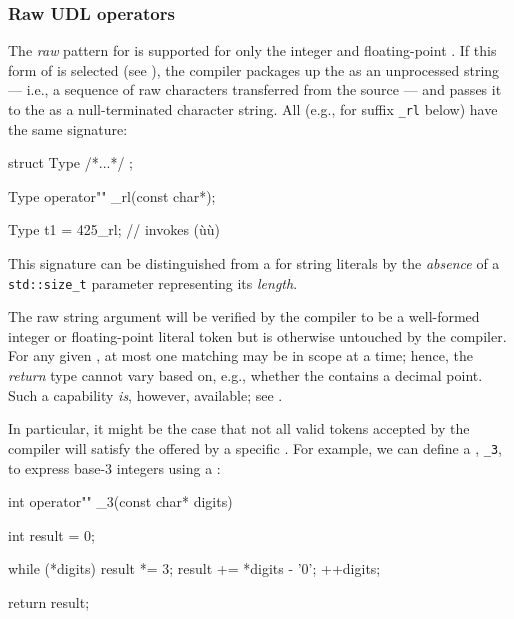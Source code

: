 \subsubsection[Raw UDL operators]{Raw UDL operators}\label{raw-udl-operators}

The \emph{raw} pattern for  is supported for only
the integer and floating-point . If this
form of  is selected (see ), the compiler packages up the  as an
unprocessed string --- i.e., a sequence of raw characters transferred
from the source --- and passes it to the  as a
null-terminated character string. All  (e.g.,
for suffix \lstinline!_rl! below) have the same signature:

\begin{emcppslisting}
struct Type { /*...*/ };

Type operator"" _rl(const char*);

Type t1 = 425_rl;  // invokes (ù{}ù)
\end{emcppslisting}
    
\noindent This signature can be distinguished from a  for string literals by the \emph{absence} of a
\lstinline!std::size_t! parameter representing its \emph{length}.

The raw string argument will be verified by the compiler to be a
well-formed integer or floating-point literal token but is otherwise
untouched by the compiler. For any given , at most
one matching  may be in scope at a time; hence,
the \emph{return} type cannot vary based on, e.g., whether the
 contains a decimal point. Such a capability
\emph{is}, however, available; see .

In particular, it might be the case that not all valid tokens accepted
by the compiler will satisfy the  offered by a
specific . For example, we can define a , \lstinline!_3!, to express base-3 integers using a :

\begin{emcppslisting}
int operator"" _3(const char* digits)
{
    int result = 0;

    while (*digits)
    {
        result *= 3;
        result += *digits - '0';
        ++digits;
    }

    return result;
}
\end{emcppslisting}
    
